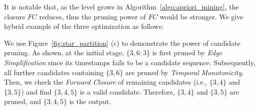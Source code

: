 It is notable that, as the level grows in Algorithm~\ref{algo:apriori_mining}, the closure $FC$
reduces, thus the pruning power of $FC$ would be stronger. We give hybrid example of the three
optimization as follows:
%

\begin{example}
We use Figure~\ref{fig:star_partition} (c) to 
demonstrate the power of candidate pruning. 
As shown, at the initial stage, $\{3,6:3\}$ is first pruned by \textit{Edge Simplification} since its
timestamps fails to be a candidate sequence. Subsequently, all further candidates containing $\{3,6\}$ 
are pruned by \textit{Temporal Monotonicity}. Then, we check the \textit{Forward Closure} 
of remaining candidates (i.e., $\{3,4\}$ and $\{3,5\}$) and find $\{3,4,5\}$ is a
valid candidate. Therefore, $\{3,4\}$ and $\{3,5\}$ are pruned, and $\{3,4,5\}$ is the output.
\end{example}
%

